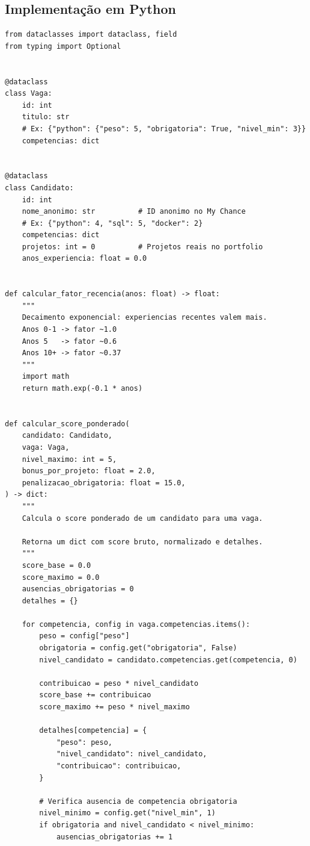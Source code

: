 \documentclass[12pt,a4paper]{article}
\begin{document}
\subsection{Implementação em Python}

\begin{lstlisting}[caption={Pontuação ponderada com bônus e penalizações},
                   label={lst:wss}]
from dataclasses import dataclass, field
from typing import Optional


@dataclass
class Vaga:
    id: int
    titulo: str
    # Ex: {"python": {"peso": 5, "obrigatoria": True, "nivel_min": 3}}
    competencias: dict


@dataclass
class Candidato:
    id: int
    nome_anonimo: str          # ID anonimo no My Chance
    # Ex: {"python": 4, "sql": 5, "docker": 2}
    competencias: dict
    projetos: int = 0          # Projetos reais no portfolio
    anos_experiencia: float = 0.0


def calcular_fator_recencia(anos: float) -> float:
    """
    Decaimento exponencial: experiencias recentes valem mais.
    Anos 0-1 -> fator ~1.0
    Anos 5   -> fator ~0.6
    Anos 10+ -> fator ~0.37
    """
    import math
    return math.exp(-0.1 * anos)


def calcular_score_ponderado(
    candidato: Candidato,
    vaga: Vaga,
    nivel_maximo: int = 5,
    bonus_por_projeto: float = 2.0,
    penalizacao_obrigatoria: float = 15.0,
) -> dict:
    """
    Calcula o score ponderado de um candidato para uma vaga.

    Retorna um dict com score bruto, normalizado e detalhes.
    """
    score_base = 0.0
    score_maximo = 0.0
    ausencias_obrigatorias = 0
    detalhes = {}

    for competencia, config in vaga.competencias.items():
        peso = config["peso"]
        obrigatoria = config.get("obrigatoria", False)
        nivel_candidato = candidato.competencias.get(competencia, 0)

        contribuicao = peso * nivel_candidato
        score_base += contribuicao
        score_maximo += peso * nivel_maximo

        detalhes[competencia] = {
            "peso": peso,
            "nivel_candidato": nivel_candidato,
            "contribuicao": contribuicao,
        }

        # Verifica ausencia de competencia obrigatoria
        nivel_minimo = config.get("nivel_min", 1)
        if obrigatoria and nivel_candidato < nivel_minimo:
            ausencias_obrigatorias += 1


\end{lstlisting}
\end{document}
